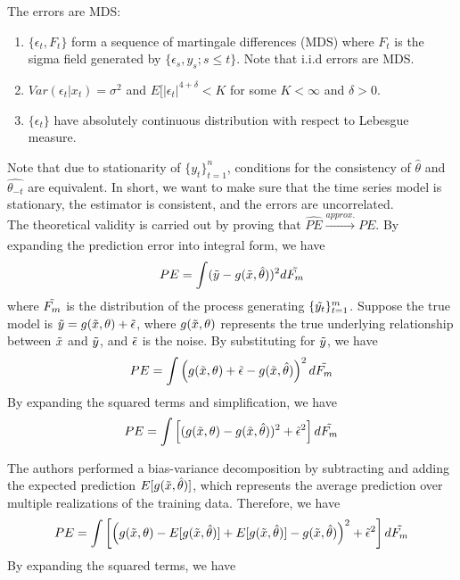 \documentclass[12pt, oneside]{amsart}
\theoremstyle{definition}
\theoremstyle{remark}
\numberwithin{equation}{section}
\begin{document}
\begin{assumption}\label{assump3}
The errors are MDS: 
\begin{enumerate}
    \item $ \{ \epsilon_t,F_t \}$ form a sequence of martingale differences (MDS) where $F_t$ is the sigma field generated by $ \{ \epsilon_s, y_s;s \leq t \} $. Note that i.i.d errors are MDS.
    \item $Var(\epsilon_t | x_t) = \sigma^2$ and $E[|\epsilon_t|^{4+\delta} < K$ for some $K < \infty$ and $\delta > 0$.
    \item $\{\epsilon_t\}$ have absolutely continuous distribution with respect to Lebesgue measure. 
\end{enumerate}
\end{assumption}

Note that due to stationarity of $\{y_t\}^n_{t=1}$, conditions for the consistency of $\hat{\theta}$ and $\hat{\theta_{-t}}$ are equivalent. In short, we want to make sure that the time series model is stationary, the estimator is consistent, and the errors are uncorrelated.  \\

The theoretical validity is carried out by proving that $\hat{PE} \xrightarrow[]{approx.} PE$. By expanding the prediction error into integral form, we have
$$PE = \int (\Tilde{y} - g(\Tilde{x},\hat{\theta}))^2 d\Tilde{F_m}$$
where $\Tilde{F_m}$ is the distribution of the process generating $\{\Tilde{y_t}\}^m_{t=1}$. Suppose the true model is $\Tilde{y} = g(\Tilde{x}, \theta) + \Tilde{\epsilon}$, where $g(\Tilde{x}, \theta)$ represents the true underlying relationship between $\Tilde{x}$ and $\Tilde{y}$, and $\Tilde{\epsilon}$ is the noise. By substituting for $\Tilde{y}$, we have 
$$PE = \int \left( g(\Tilde{x}, \theta) + \Tilde{\epsilon} - g(\Tilde{x},\hat{\theta}) \right)^2 d\Tilde{F_m}$$ By expanding the squared terms and simplification, we have 
$$PE = \int \left[ (g(\Tilde{x}, \theta) - g(\Tilde{x},\hat{\theta}))^2 + \Tilde{\epsilon}^ 2 \right] d\Tilde{F_m}$$

The authors performed a bias-variance decomposition by subtracting and adding the expected prediction $E[g(\Tilde{x}, \hat{\theta})]$, which represents the average prediction over multiple realizations of the training data. Therefore, we have 
$$ PE = \int \left[ \left(g(\Tilde{x}, \theta) - E[g(\Tilde{x}, \hat{\theta})] + E[g(\Tilde{x}, \hat{\theta})] - g(\Tilde{x},\hat{\theta})\right)^2 + \Tilde{\epsilon}^2 \right] d\Tilde{F_m}$$ By expanding the squared terms, we have
\end{document}
